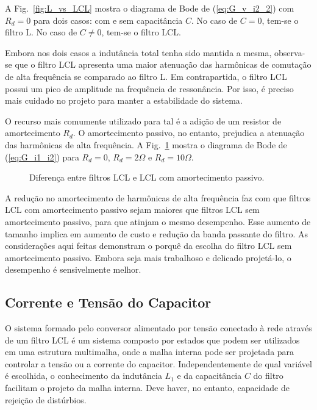   A Fig.~\ref{fig:L_vs_LCL} mostra o diagrama de Bode de (\ref{eq:G_v_i2_2}) com $R_d = 0$ para dois casos: com e sem capacitância $C$. No caso de $C = 0$, tem-se o filtro L. No caso de $C \neq 0$, tem-se o filtro LCL.

  Embora nos dois casos a indutância total tenha sido mantida a mesma, observa-se que o filtro LCL apresenta uma maior atenuação das harmônicas de comutação de alta frequência se comparado ao filtro L. Em contrapartida, o filtro LCL possui um pico de amplitude na frequência de ressonância. Por isso, é preciso mais cuidado no projeto para manter a estabilidade do sistema.

  O recurso mais comumente utilizado para tal é a adição de um resistor de amortecimento $R_d$. O amortecimento passivo, no entanto, prejudica a atenuação das harmônicas de alta frequência. A Fig.~\ref{fig:R_in_LCL} mostra o diagrama de Bode de (\ref{eq:G_i1_i2}) para $R_d = 0$, $R_d = 2\Omega$ e $R_d = 10\Omega$.

  \begin{figure}[htb]
    \centering{
      \def\svgwidth{\textwidth}
      }
    \caption{Diferença entre filtros LCL e LCL com amortecimento passivo.}
    \label{fig:R_in_LCL}
  \end{figure}

  A redução no amortecimento de harmônicas de alta frequência faz com que filtros LCL com amortecimento passivo sejam maiores que filtros LCL sem amortecimento passivo, para que atinjam o mesmo desempenho. Esse aumento de tamanho implica em aumento de custo e redução da banda passante do filtro. As considerações aqui feitas demonstram o porquê da escolha do filtro LCL sem amortecimento passivo. Embora seja mais trabalhoso e delicado projetá-lo, o desempenho é sensivelmente melhor.


\subsection{Corrente e Tensão do Capacitor}

  O sistema formado pelo conversor alimentado por tensão conectado à rede através de um filtro LCL é um sistema composto por estados que podem ser utilizados em uma estrutura multimalha, onde a malha interna pode ser projetada para controlar a tensão ou a corrente do capacitor. Independentemente de qual variável é escolhida, o conhecimento da indutância $L_1$ e da capacitância $C$ do filtro facilitam o projeto da malha interna. Deve haver, no entanto, capacidade de rejeição de distúrbios.

